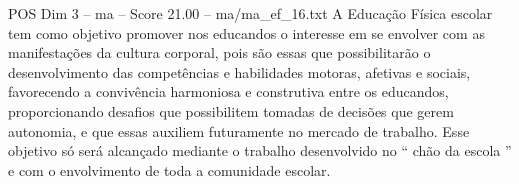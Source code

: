 \begin{textsample}{POS Dim 3 – ma – Score 21.00 – ma/ma\_ef\_16.txt}
A Educação Física escolar tem como objetivo promover nos educandos o interesse em se envolver com as manifestações da cultura corporal, pois são essas que possibilitarão o desenvolvimento das competências e habilidades motoras, afetivas e sociais, favorecendo a convivência harmoniosa e construtiva entre os educandos, proporcionando desafios que possibilitem tomadas de decisões que gerem autonomia, e que essas auxiliem futuramente no mercado de trabalho.
Esse objetivo só será alcançado mediante o trabalho desenvolvido no “ chão da escola ” e com o envolvimento de toda a comunidade escolar.

\end{textsample}
